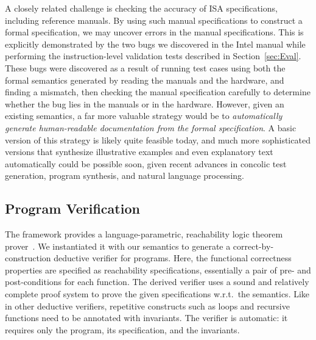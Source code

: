 A closely related challenge is checking the accuracy of ISA specifications, including reference manuals.
%
By using such manual specifications to construct a formal specification, we may uncover errors in the manual specifications.
%
This is explicitly demonstrated by the two bugs we discovered in the Intel \ISA manual while performing the instruction-level validation tests described in Section~\ref{sec:Eval}.
%
These bugs were discovered as a result of running test cases using both the formal semantics generated by reading the manuals and the hardware, and finding a mismatch, then checking the manual specification  carefully to determine whether the bug lies in the manuals or in the hardware.
%
However, given an existing semantics, a far more valuable strategy would be to \emph{automatically generate human-readable documentation from the formal specification}.
%
A basic version of this strategy is likely quite feasible today, and much more sophisticated versions that synthesize illustrative examples and even explanatory text automatically could be possible soon, given recent advances in concolic test generation, program synthesis, and natural language processing.

%

\subsection{Program Verification}
\label{sec:Appl:Verification}



The \K framework provides a language-parametric, reachability logic theorem prover~\cite{Stefanescu:2016,Rosu:2012}.  We instantiated it with our semantics to generate a correct-by-construction deductive verifier for \ISA programs.
Here, the functional correctness properties are specified as reachability specifications, essentially a pair of pre- and post-conditions for each function.
The derived \ISA verifier uses a sound and relatively complete proof system to prove the given specifications w.r.t.~the \ISA semantics.
Like in other deductive verifiers, repetitive constructs such as loops and recursive functions need to be annotated with invariants.
The verifier is automatic: it requires only the program, its specification, and the invariants.

